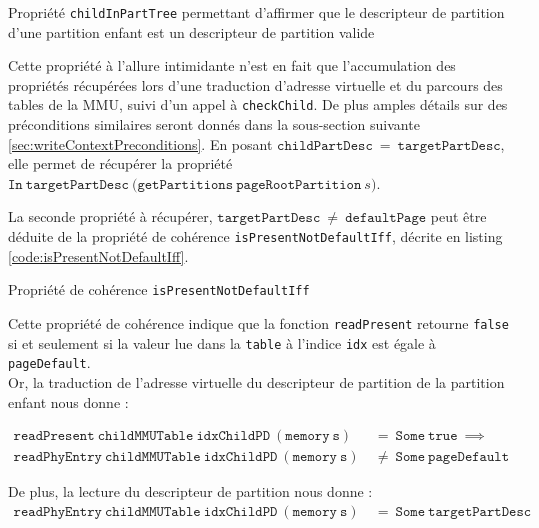 			\begin{listing}[!ht]
				\caption{Propriété \texttt{childInPartTree} permettant d'affirmer que le descripteur de partition d'une partition enfant est un descripteur de partition valide}
				\label{code:childInPartTree}
			\end{listing}

			Cette propriété à l'allure intimidante n'est en fait que l'accumulation des propriétés récupérées lors d'une traduction d'adresse virtuelle et du parcours des tables de la MMU, suivi d'un appel à \texttt{checkChild}. De plus amples détails sur des préconditions similaires seront donnés dans la sous-section suivante \ref{sec:writeContextPreconditions}. En posant $\mathtt{childPartDesc}~=~\mathtt{targetPartDesc}$, elle permet de récupérer la propriété $\mathtt{In~targetPartDesc~(getPartitions~pageRootPartition}~s)$. 

			La seconde propriété à récupérer, $\mathtt{targetPartDesc}~\neq~\mathtt{defaultPage}$ peut être déduite de la propriété de cohérence \texttt{isPresentNotDefaultIff}, décrite en listing \ref{code:isPresentNotDefaultIff}.
			\begin{listing}[!ht]
				\caption{Propriété de cohérence \texttt{isPresentNotDefaultIff}}
				\label{code:isPresentNotDefaultIff}
			\end{listing}

			Cette propriété de cohérence indique que la fonction \texttt{readPresent} retourne \texttt{false} si et seulement si la valeur lue dans la \texttt{table} à l'indice \texttt{idx} est égale à \texttt{pageDefault}.\\
			Or, la traduction de l'adresse virtuelle du descripteur de partition de la partition enfant nous donne :

			\vspace{-0.5cm}
			\begin{align*}
				\mathtt{readPresent~childMMUTable~idxChildPD~(memory~s)}~&=~\mathtt{Some~true}~\implies\\
				\mathtt{readPhyEntry~childMMUTable~idxChildPD~(memory~s)}~&\neq~\mathtt{Some~pageDefault}
			\end{align*}

			De plus, la lecture du descripteur de partition nous donne :
			\begin{align*}
				\mathtt{readPhyEntry~childMMUTable~idxChildPD~(memory~s)}~&=~\mathtt{Some~targetPartDesc}
			\end{align*}

